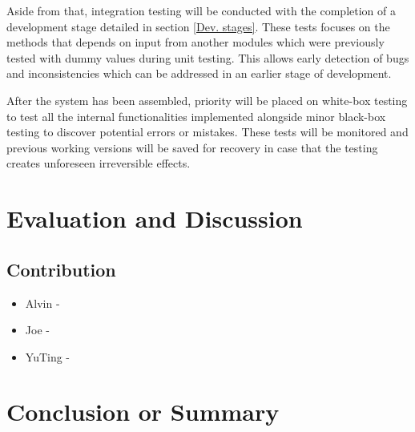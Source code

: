 \documentclass[11pt]{article}
\begin{document}
Aside from that, integration testing will be conducted with the completion of a development stage detailed in section \ref{Dev. stages}. These tests focuses on the methods that depends on input from another modules which were previously tested with dummy values during unit testing. This allows early detection of bugs and inconsistencies which can be addressed in an earlier stage of development.

After the system has been assembled, priority will be placed on white-box testing to test all the internal functionalities implemented alongside minor black-box testing to discover potential errors or mistakes. These tests will be monitored and previous working versions will be saved for recovery in case that the testing creates unforeseen irreversible effects.

\section{Evaluation and Discussion}
\subsection{Contribution}
\begin{itemize}
	\item Alvin  -
	\item Joe    - 
	\item YuTing -
\end{itemize}
\section{Conclusion or Summary}

\clearpage

%
 
\end{document}
